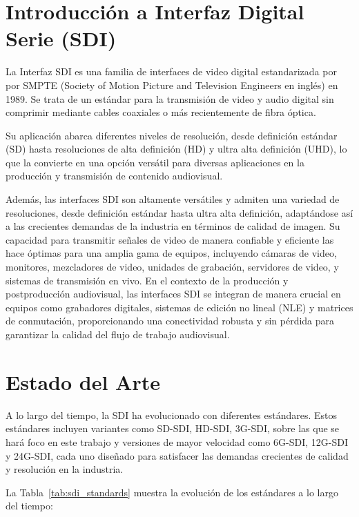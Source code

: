 \section{Introducción a Interfaz Digital Serie (SDI)}

La Interfaz SDI es una familia de interfaces de video digital estandarizada por
por SMPTE (Society of Motion Picture and Television Engineers en inglés) en
1989. Se trata de un estándar para la transmisión de video y audio digital sin
comprimir mediante cables coaxiales o más recientemente de fibra óptica.

Su aplicación abarca diferentes niveles de resolución, desde definición
estándar (SD) hasta resoluciones de alta definición (HD) y ultra alta
definición (UHD), lo que la convierte en una opción versátil para diversas
aplicaciones en la producción y transmisión de contenido audiovisual.

Además, las interfaces SDI son altamente versátiles y admiten una variedad de
resoluciones, desde definición estándar hasta ultra alta definición, adaptándose
así a las crecientes demandas de la industria en términos de calidad de imagen.
Su capacidad para transmitir señales de video de manera confiable y eficiente
las hace óptimas para una amplia gama de equipos, incluyendo cámaras de video,
monitores, mezcladores de video, unidades de grabación, servidores de video, y
sistemas de transmisión en vivo. En el contexto de la producción y
postproducción audiovisual, las interfaces SDI se integran de manera crucial en
equipos como grabadores digitales, sistemas de edición no lineal (NLE) y 
matrices de conmutación, proporcionando una conectividad robusta y sin pérdida
para garantizar la calidad del flujo de trabajo audiovisual.

\section{Estado del Arte}

A lo largo del tiempo, la SDI ha evolucionado con diferentes estándares. Estos
estándares incluyen variantes como SD-SDI, HD-SDI, 3G-SDI, sobre las que se
hará foco en este trabajo y versiones de mayor velocidad como 6G-SDI, 12G-SDI
y 24G-SDI, cada uno diseñado para satisfacer las demandas crecientes de calidad
y resolución en la industria.

La Tabla~\ref{tab:sdi_standards} muestra la evolución de los estándares a lo largo del tiempo:

